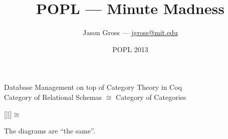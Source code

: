 \documentclass[utf8x]{beamer}
\begin{document}
\title{POPL --- Minute Madness}
\date{POPL 2013}
\author{Jason Gross --- \href{mailto:jgross@mit.edu}{jgross@mit.edu}}

\begin{frame}{Database Management on top of Category Theory in Coq \\ Category of Relational Schemas $\cong$ Category of Categories}
  \begin{center}
     \raisebox{-3.5ex}[\height][\depth]{$\cong$}

    \vspace{6ex} The diagrams are ``the same''.
  \end{center}
\end{frame}
\end{document}
